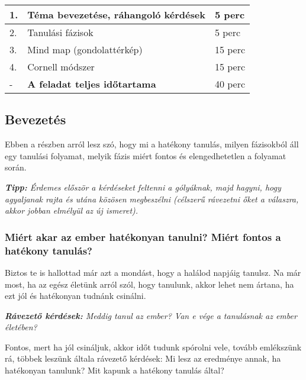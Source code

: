 \documentclass[../Main.tex]{subfiles}
\begin{document}
\begin{center}
    \begin{tabular}{| m{1.3 em} | m{} | m{} |}
    \hline
    1. & Téma bevezetése, ráhangoló kérdések & 5 perc \\
    \hline
    2. & Tanulási fázisok & 5 perc \\
    \hline
    3. & Mind map (gondolattérkép) & 15 perc \\
    \hline
    4. & Cornell módszer & 15 perc \\
    \hline
    - & \textbf{A feladat teljes időtartama} & 40 perc \\
    \hline
    \end{tabular}
\end{center}

\subsection{Bevezetés}

\begin{flushleft}
    Ebben a részben arról lesz szó, hogy mi a hatékony tanulás, milyen fázisokból áll egy tanulási folyamat,
    melyik fázis miért fontos és elengedhetetlen a folyamat során.
\end{flushleft}


\textit{\textbf{Tipp:} Érdemes először a kérdéseket feltenni a gólyáknak, majd hagyni, hogy agyaljanak rajta és utána közösen megbeszélni (célszerű rávezetni őket a válaszra, akkor jobban elmélyül az új ismeret).
}

\subsubsection{Miért akar az ember hatékonyan tanulni? \newline Miért fontos a hatékony tanulás?}

\begin{flushleft}
    Biztos te is hallottad már azt a mondást, hogy a halálod napjáig tanulsz.
    Na már most, ha az egész életünk arról szól, hogy tanulunk, akkor lehet nem ártana,
    ha ezt jól és hatékonyan tudnánk csinálni.
\end{flushleft}

    \textit{\textbf{Rávezető kérdések:} Meddig tanul az ember? Van e vége a tanulásnak az ember életében?}

\begin{flushleft}
    Fontos, mert ha jól csináljuk, akkor időt tudunk spórolni vele, tovább emlékszünk rá, többek leszünk általa
    rávezető kérdések: Mi lesz az eredménye annak, ha hatékonyan tanulunk? Mit kapunk a hatékony tanulás által?
\end{flushleft}
    
\end{document}
